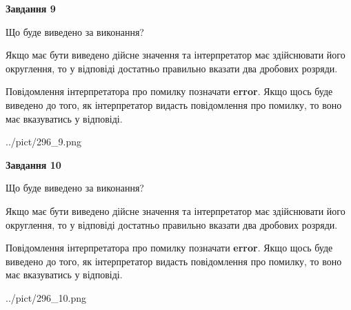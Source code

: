 \documentclass[12pt, ukrainian]{article}
\begin{document}
{\begin {Large}
{\begin {center}\textbf{Завдання 9}\end {center}}\par
Що буде виведено за виконання? \par

Якщо має бути виведено дійсне значення та інтерпретатор має здійснювати його округлення, 
то у відповіді достатньо правильно вказати два дробових розряди.

Повідомлення інтерпретатора про помилку позначати \textbf{error}.
Якщо щось буде виведено до того, як інтерпретатор видасть повідомлення про помилку, 
то воно має вказуватись у відповіді. \par

\begin{center}
	{../pict/296_9.png}
\end{center}
\newpage

{\begin {center}\textbf{Завдання 10}\end {center}}\par
Що буде виведено за виконання? \par

Якщо має бути виведено дійсне значення та інтерпретатор має здійснювати його округлення, 
то у відповіді достатньо правильно вказати два дробових розряди.

Повідомлення інтерпретатора про помилку позначати \textbf{error}.
Якщо щось буде виведено до того, як інтерпретатор видасть повідомлення про помилку, 
то воно має вказуватись у відповіді. \par

\begin{center}
	{../pict/296_10.png}
\end{center}
\newpage

\end {Large}}
\end{document}
